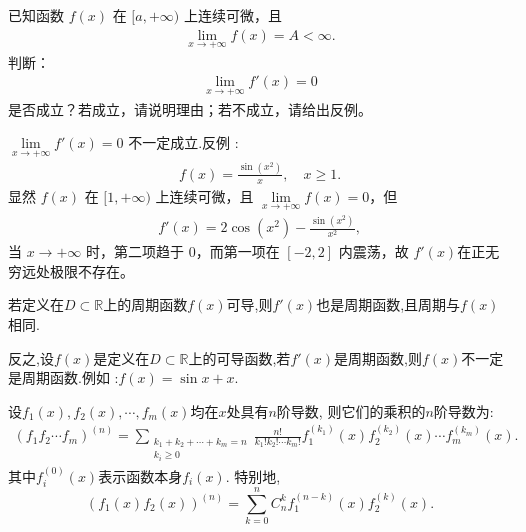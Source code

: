 \documentclass[../../main.tex]{subfiles}%
\begin{document}
\begin{example}
已知函数 $f(x)$ 在 $[a, +\infty)$ 上连续可微，且
\begin{align*}
\lim\limits_{x\to +\infty} f(x) = A < \infty.
\end{align*}
判断：
\begin{align*}
\lim\limits_{x\to +\infty} f'(x) = 0
\end{align*}
是否成立？若成立，请说明理由；若不成立，请给出反例。
\end{example}
\begin{solution}
$\lim\limits_{x\to +\infty} f'(x) = 0$ 不一定成立.反例 :
\begin{align*}
f(x) = \frac{\sin(x^2)}{x}, \quad x \geqslant 1.
\end{align*}
显然 $f(x)$ 在 $[1, +\infty)$ 上连续可微，且 $\lim\limits_{x\to +\infty} f(x) = 0$，但
\begin{align*}
f'(x) = 2\cos(x^2) - \frac{\sin(x^2)}{x^2},
\end{align*}
当 $x\to +\infty$ 时，第二项趋于 $0$，而第一项在 $[-2,2]$ 内震荡，故 $f'(x)$在正无穷远处极限不存在。
\end{solution}

\begin{proposition}
若定义在$D\subset \mathbb{R}$上的周期函数$f(x)$可导,则$f'(x)$也是周期函数,且周期与$f(x)$相同.
\end{proposition}
\begin{remark}
反之,设$f(x)$是定义在$D\subset \mathbb{R}$上的可导函数,若$f'(x)$是周期函数,则$f(x)$不一定是周期函数.例如 :$f(x)=\sin x +x$.
\end{remark}

\begin{theorem}[Leibniz公式]\label{theorem:Leibniz公式}
设$f_1(x), f_2(x), \cdots, f_m(x)$均在$x$处具有$n$阶导数, 则它们的乘积的$n$阶导数为:
\begin{align*}
\left(f_1 f_2 \cdots f_m\right)^{(n)} = \sum\limits_{\substack{k_1+k_2+\cdots+k_m=n \\ k_i\geqslant 0}} \frac{n!}{k_1! k_2! \cdots k_m!} f_1^{(k_1)}(x) f_2^{(k_2)}(x) \cdots f_m^{(k_m)}(x).
\end{align*}
其中$f_i^{(0)}(x)$表示函数本身$f_i(x)$.
特别地,
$$(f_1(x)f_2(x))^{(n)} = \sum_{k = 0}^{n} C_{n}^{k}f_1^{(n - k)}(x)f_2^{(k)}(x).$$
\end{theorem}
\end{document}
